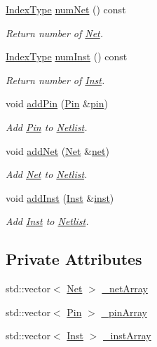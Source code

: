 \begin{DoxyCompactItemize}
\hyperlink{type_8h_a581e8093e28e7362f2b6937296190676}{Index\+Type} \hyperlink{classNetlist_aead543556d8cea4364a852d1bb2e3b68}{num\+Net} () const
\begin{DoxyCompactList}\small\item\em Return number of \hyperlink{classNet}{Net}. \end{DoxyCompactList}\item 
\hyperlink{type_8h_a581e8093e28e7362f2b6937296190676}{Index\+Type} \hyperlink{classNetlist_aa9b8924df39d788ba5f70f11ea083fea}{num\+Inst} () const
\begin{DoxyCompactList}\small\item\em Return number of \hyperlink{classInst}{Inst}. \end{DoxyCompactList}\item 
void \hyperlink{classNetlist_af0e34bf0cae6f4dd74e4e553c9e7ca1c}{add\+Pin} (\hyperlink{classPin}{Pin} \&\hyperlink{classNetlist_a0aac5b79ca1a820f0adc7b79f1b0520d}{pin})
\begin{DoxyCompactList}\small\item\em Add \hyperlink{classPin}{Pin} to \hyperlink{classNetlist}{Netlist}. \end{DoxyCompactList}\item 
void \hyperlink{classNetlist_ab26277ae8a5f0ef605709c27e63c5492}{add\+Net} (\hyperlink{classNet}{Net} \&\hyperlink{classNetlist_a066ebef33fd139a25a50af1a144a8361}{net})
\begin{DoxyCompactList}\small\item\em Add \hyperlink{classNet}{Net} to \hyperlink{classNetlist}{Netlist}. \end{DoxyCompactList}\item 
void \hyperlink{classNetlist_a9214addbaff42dc7041509529d0ccb3c}{add\+Inst} (\hyperlink{classInst}{Inst} \&\hyperlink{classNetlist_a0670a50d2a63b33b1fb72c7b0d352c11}{inst})
\begin{DoxyCompactList}\small\item\em Add \hyperlink{classInst}{Inst} to \hyperlink{classNetlist}{Netlist}. \end{DoxyCompactList}\end{DoxyCompactItemize}
\subsection*{Private Attributes}
\begin{DoxyCompactItemize}
\item 
std\+::vector$<$ \hyperlink{classNet}{Net} $>$ \hyperlink{classNetlist_a88ad89f8acc15d2971b0689adaad8704}{\+\_\+net\+Array}
\item 
std\+::vector$<$ \hyperlink{classPin}{Pin} $>$ \hyperlink{classNetlist_a918185a2ba92067c416408dfc9d8fab2}{\+\_\+pin\+Array}
\item 
std\+::vector$<$ \hyperlink{classInst}{Inst} $>$ \hyperlink{classNetlist_a301a0c44a335af1bc3af743f645eae9e}{\+\_\+inst\+Array}
\end{DoxyCompactItemize}


